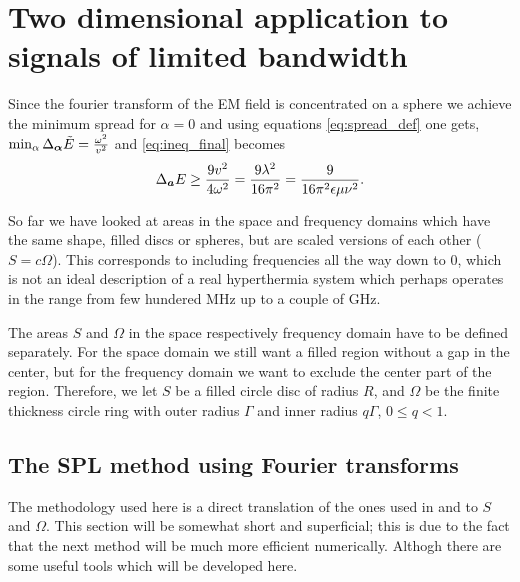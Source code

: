 \documentclass[11pt,a4paper, 
swedish,english %
]{article}
\begin{document}
\section{Two dimensional application to
 signals of limited bandwidth}
Since the fourier transform of the EM field is concentrated on a sphere we achieve the minimum spread for $\alpha=0$ and using equations \eqref{eq:spread_def} one gets,
$\min_\alpha\Delta_{\vb*\alpha}\tilde{E}=\frac{\omega^2}{v^2}$ and \eqref{eq:ineq_final} becomes
\begin{equation}
 \Delta_{\vb*a}E\geq \frac{9v^2}{4\omega^2}=\frac{9\lambda^2}{16\pi^2}=\frac{9}{16\pi^2\epsilon\mu\nu^2}.
 \end{equation}

So far we have looked at areas in the space and frequency domains
which have the same shape, filled discs or spheres, but are scaled
versions of each other ($S=c\Omega$). This corresponds to
including frequencies all the way down to 0, which is not an ideal
description of a real hyperthermia system which perhaps operates in the
range from few hundered MHz up to a couple of GHz.

The areas $S$ and $\Omega$ in the space respectively frequency domain have to
be defined separately.
For the space domain we still want a
filled region without a gap in the center, but for the frequency domain
we want to exclude the center part of the region.
Therefore, we let $S$ be a filled
circle disc of radius $R$, and $\Omega$ be the finite thickness circle
ring with outer radius $\Gamma$ and inner radius $q\Gamma$, $0\le q<1$.


\subsection{The SPL method using Fourier transforms}
The methodology used here is a direct translation of the ones used in
\cite{PSWF-I_1961} and \cite{PSWF-IV_1964} to $S$ and $\Omega$. This
section will be somewhat short and superficial; this is due to the
fact that the next method will be much more efficient
numerically. Althogh there are some useful tools which will be
developed here.
\end{document}
